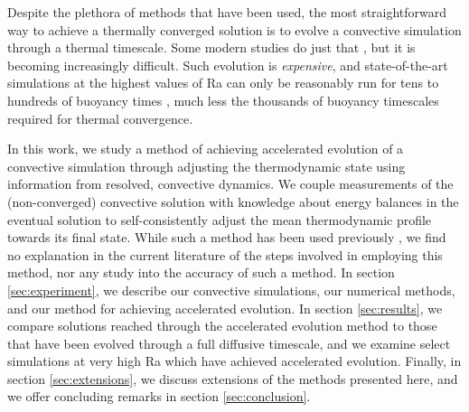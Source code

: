\documentclass[aps, pre, onecolumn, nofootinbib, notitlepage, groupedaddress, amsfonts, amssymb, amsmath, longbibliography]{revtex4-1}
\begin{document}
Despite the plethora of methods that have been used,
the most straightforward way to achieve a thermally converged solution
is to evolve a convective simulation through a thermal timescale. Some modern
studies do just that \cite{featherstone&hindman2016}, but it is becoming
increasingly difficult. Such evolution is
\emph{expensive}, and state-of-the-art simulations at the highest values of Ra
can only be reasonably run
for tens to hundreds of buoyancy times \cite{stevens&all2011}, much less the
thousands of buoyancy timescales required for thermal convergence.

In this work, we study a method of achieving accelerated evolution of a
convective simulation through adjusting the thermodynamic state using information 
from resolved, convective dynamics. We couple measurements of the (non-converged)
convective solution with knowledge about energy balances in the eventual solution
to self-consistently adjust the mean thermodynamic profile towards its final state. 
While such a method has been used previously \cite{hurlburt&all1986}, 
we find no explanation in the current literature of the steps involved in employing
this method, nor any study into the accuracy of such a method.
In section \ref{sec:experiment}, we describe our convective simulations, our
numerical methods, and our method for achieving accelerated evolution. In
section \ref{sec:results}, we compare solutions reached through the accelerated evolution
method to those that have been evolved through a full diffusive timescale, and we
examine select simulations at very high Ra which have achieved accelerated evolution. Finally,
in section \ref{sec:extensions}, we discuss extensions of the methods presented here,
and we offer concluding remarks in section \ref{sec:conclusion}.
\end{document}
